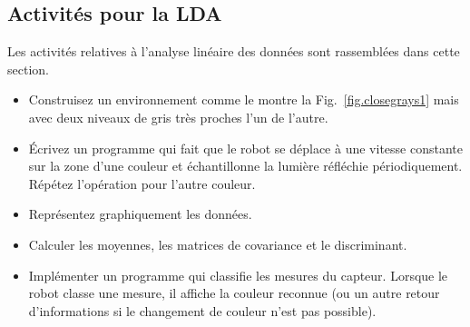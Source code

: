 \subsection{Activités pour la LDA}

Les activités relatives à l'analyse linéaire des données sont rassemblées dans cette section.

\begin{framed}
\begin{itemize}
\item Construisez un environnement comme le montre la Fig.~\ref{fig.closegrays1} mais avec deux niveaux de gris très proches l'un de l'autre.
\item Écrivez un programme qui fait que le robot se déplace à une vitesse constante sur la zone d'une couleur et échantillonne la lumière réfléchie périodiquement. Répétez l'opération pour l'autre couleur.
\item Représentez graphiquement les données.
\item Calculer les moyennes, les matrices de covariance et le discriminant. 
\item Implémenter un programme qui classifie les mesures du capteur. Lorsque le robot classe une mesure, il affiche la couleur reconnue (ou un autre retour d'informations si le changement de couleur n'est pas possible).
\end{itemize}
\end{framed}

